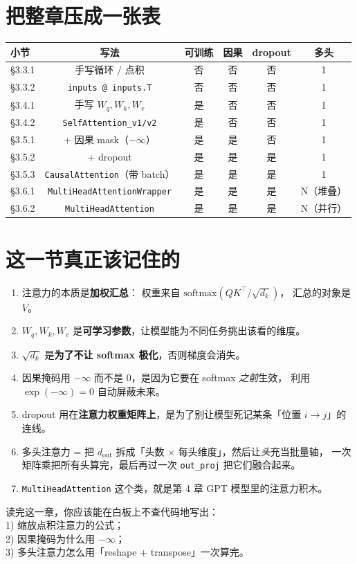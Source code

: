 \documentclass[11pt,a4paper]{ctexart}
\begin{document}
\section{把整章压成一张表}

\begin{center}
\renewcommand{\arraystretch}{1.2}
\begin{tabular}{@{}lccccc@{}}
\toprule
小节 & 写法 & 可训练 & 因果 & dropout & 多头 \\
\midrule
§3.3.1 & 手写循环 / 点积                    & 否 & 否 & 否 & 1 \\
§3.3.2 & \texttt{inputs @ inputs.T}        & 否 & 否 & 否 & 1 \\
§3.4.1 & 手写 $W_q, W_k, W_v$              & 是 & 否 & 否 & 1 \\
§3.4.2 & \texttt{SelfAttention\_v1/v2}      & 是 & 否 & 否 & 1 \\
§3.5.1 & + 因果 mask（$-\infty$）          & 是 & 是 & 否 & 1 \\
§3.5.2 & + dropout                          & 是 & 是 & 是 & 1 \\
§3.5.3 & \texttt{CausalAttention}（带 batch）& 是 & 是 & 是 & 1 \\
§3.6.1 & \texttt{MultiHeadAttentionWrapper}  & 是 & 是 & 是 & N（堆叠）\\
§3.6.2 & \texttt{MultiHeadAttention}         & 是 & 是 & 是 & N（并行）\\
\bottomrule
\end{tabular}
\end{center}

\section{这一节真正该记住的}

\begin{enumerate}[label=\textbf{\arabic*.}]
  \item 注意力的本质是\textbf{加权汇总}：
        权重来自 $\mathrm{softmax}(QK^\top / \sqrt{d_k})$，
        汇总的对象是 $V$。
  \item $W_q, W_k, W_v$ 是\textbf{可学习参数}，让模型能为不同任务挑出该看的维度。
  \item $\sqrt{d_k}$ 是\textbf{为了不让 softmax 极化}，否则梯度会消失。
  \item 因果掩码用 $-\infty$ 而不是 $0$，是因为它要在 softmax \emph{之前}生效，
        利用 $\exp(-\infty) = 0$ 自动屏蔽未来。
  \item dropout 用在\textbf{注意力权重矩阵上}，是为了别让模型死记某条「位置 $i \to j$」的连线。
  \item 多头注意力 = 把 $d_{\text{out}}$ 拆成「头数 × 每头维度」，然后让\emph{头}充当批量轴，
        一次矩阵乘把所有头算完，最后再过一次 \texttt{out\_proj} 把它们融合起来。
  \item \texttt{MultiHeadAttention} 这个类，就是第 4 章 GPT 模型里的注意力积木。
\end{enumerate}

\begin{keypointblock}
读完这一章，你应该能在白板上不查代码地写出：\\
1) 缩放点积注意力的公式；\\
2) 因果掩码为什么用 $-\infty$；\\
3) 多头注意力怎么用「reshape + transpose」一次算完。
\end{keypointblock}
\end{document}
